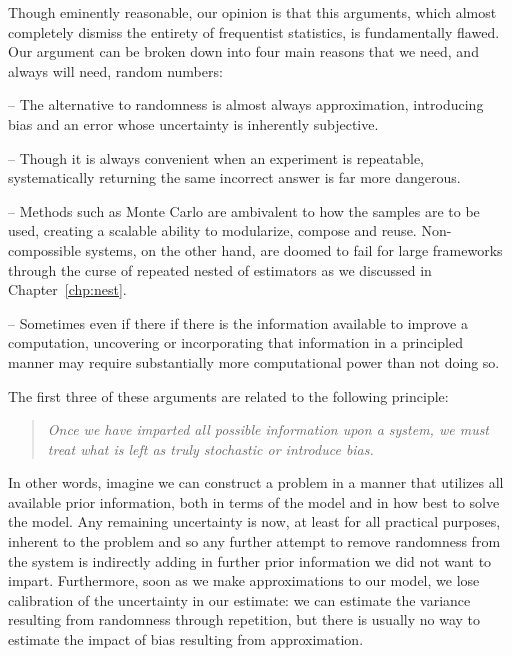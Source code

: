 Though eminently reasonable, our opinion is that this arguments, which almost completely dismiss the entirety
of frequentist statistics, is fundamentally flawed.  Our argument can be broken down into four main reasons 
that we need, and always will need, random numbers:
\begin{description}[align=left]
	\setlength\itemsep{-0.1em}
	\item[Honesty and reliability] -- The alternative to randomness is almost always approximation, introducing bias 
	and an error whose uncertainty is inherently subjective.
	\item[Lack of repeatability] -- Though it is always convenient when an experiment is repeatable, systematically 
	returning the same incorrect answer is far more dangerous.
		\item[Compossibility] -- Methods such as Monte Carlo are ambivalent to how the samples are to be used, creating 
		a scalable ability to modularize, compose and reuse.  Non-compossible systems, on the other hand, are doomed to fail
		for large frameworks through the curse of repeated nested of estimators as we discussed in Chapter~\ref{chp:nest}.
		\item[Speed and simplicity] -- Sometimes even if there if there is the information available to improve a computation, 
		uncovering or incorporating that information in a principled manner may require substantially more computational 
		power than not doing so.
		\vspace{-10pt}
\end{description}
The first three of these arguments are related to the following principle:
\begin{quote}
	\vspace{-4pt}
\emph{Once we have imparted all possible information upon a system, we must treat what is left as truly 
	stochastic or introduce bias.}
\vspace{-8pt}
\end{quote}
In other words, imagine we can construct a problem in a manner that utilizes all available prior information,
both in terms of the model and in how best to solve the model.
Any remaining uncertainty is now, at least for all practical purposes, inherent to the problem and so any
further attempt to remove randomness from the system is indirectly adding in further prior information we
did not want to impart.  Furthermore, soon as we make approximations to our model,
 we lose calibration of the uncertainty in our estimate: we can estimate the variance
resulting from randomness through repetition, but there is usually no way to estimate the impact of bias
resulting from approximation.

